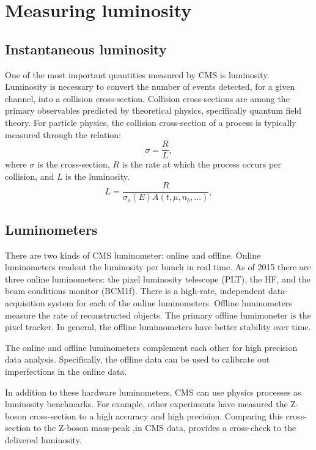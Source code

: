
\chapter{Measuring luminosity}

\section{Instantaneous luminosity}

One of the most important quantities measured by CMS is luminosity. Luminosity is necessary to convert the number of events detected, for a given channel, into a collision cross-section. Collision cross-sections are among the primary observables predicted by theoretical physics, specifically quantum field theory. For particle physics, the collision cross-section of a process is typically measured through the relation:
\begin{equation}
\sigma  = \frac{R}{\mathit{L}} ,
\end{equation}
where $\sigma$ is the cross-section, $R$ is the rate at which the process occurs per collision, and $L$ is the luminosity.
\begin{equation}
L  = \frac{R}{ \sigma_{o}(E) A(t,\mu,n_b,...)} ,
\end{equation}

\section{Luminometers}

There are two kinds of CMS luminometer: online and offline. Online luminometers readout the luminosity per bunch in real time. As of 2015 there are three online luminometers: the pixel luminosity telescope (PLT), the HF, and the beam conditions monitor (BCM1f). There is a high-rate, independent data-acquisition system for each of the online luminometers. Offline luminometers measure the rate of reconstructed objects. The primary offline lumimoneter is the pixel tracker. In general, the offline lumimometers have better stability over time. \cite{CMS:2010gua}

The online and offline luminometers complement each other for high precision data analysis. Specifically, the offline data can be used to calibrate out imperfections in the online data. 

In addition to these hardware luminometers, CMS can use physics processes as luminosity benchmarks.  For example, other experiments have measured the Z-boson cross-section to a high accuracy and high precision. Comparing this cross-section to the Z-boson mass-peak ,in CMS data, provides a cross-check to the delivered luminosity. 

